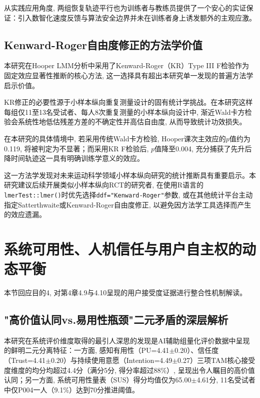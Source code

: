 从实践应用角度, 两组恢复轨迹平行也为训练者与教练员提供了一个安心的实证保证：引入数智化速度反馈与算法安全边界并未在训练者身上诱发额外的主观应激。

\subsection{Kenward-Roger自由度修正的方法学价值}
\label{sec:kr_methodology}

本研究在Hooper LMM分析中采用了Kenward-Roger（KR）Type III F检验作为固定效应显著性推断的核心方法, 这一选择具有超出本研究单一发现的普遍方法学启示价值。

KR修正的必要性源于小样本纵向重复测量设计的固有统计学挑战。在本研究这样每组仅11至13名受试者、每人8次重复测量的小样本纵向设计中, 渐近Wald卡方检验会系统性地低估残差方差的不确定性并高估自由度, 从而导致统计功效损失。

在本研究的具体情境中, 若采用传统Wald卡方检验, Hooper课次主效应的$p$值约为0.119, 将被判定为不显著；而采用KR F检验后, $p$值降至0.004, 充分捕获了先升后降时间轨迹这一具有明确训练学意义的效应。

这一方法学发现对未来运动科学领域小样本纵向研究的统计推断具有重要启示。本研究建议后续开展类似小样本纵向RCT的研究者, 在使用R语言的\texttt{lmerTest::lmer()}时优先选择\texttt{ddf="Kenward-Roger"}参数, 或在其他统计平台主动指定Satterthwaite或Kenward-Roger自由度修正, 以避免因方法学工具选择而产生的效应遗漏。

\section{系统可用性、人机信任与用户自主权的动态平衡}
\label{sec:acceptance_discussion}

本节回应目的4, 对第4章4.9与4.10呈现的用户接受度证据进行整合性机制解读。

\subsection{"高价值认同vs.易用性瓶颈"二元矛盾的深层解析}
\label{sec:usability_paradox}

本研究在系统评价维度取得的最引人深思的发现是AI辅助组量化评价数据中呈现的鲜明二元分离特征：一方面, 感知有用性（PU=4.41$\pm$0.20）、信任度（Trust=4.41$\pm$0.20）与持续使用意愿（Intention=4.49$\pm$0.27）三项TAM核心接受度维度的均分均超过4.4分（满分5分, 得分率超过88\%）, 呈现出令人瞩目的高价值认同；另一方面, 系统可用性量表（SUS）得分均值仅为65.00$\pm$4.61分, 11名受试者中仅P004一人（9.1\%）达到70分推进阈值。

